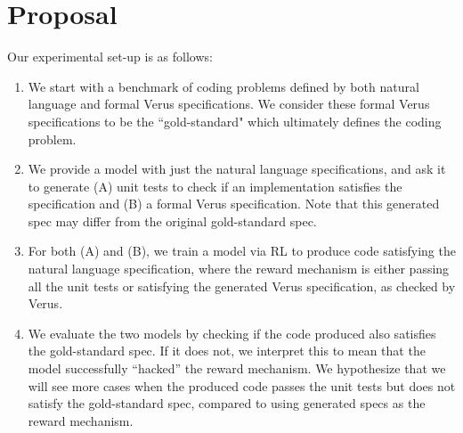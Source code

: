 \documentclass[11pt]{article}
\begin{document}
\section{Proposal}
 Our experimental set-up is as follows:
\begin{enumerate}
    \item We start with a benchmark of coding problems 
    defined by both natural language and formal Verus specifications. 
    We consider these formal Verus specifications to be the ``gold-standard" 
    which ultimately defines the coding problem.
    \item We provide a model with just the natural language specifications, 
    and ask it to generate 
    (A) unit tests to check if an implementation satisfies the specification and 
    (B) a formal Verus specification. 
    Note that this generated spec may differ from the original gold-standard spec.
    \item For both (A) and (B), we train a model via RL to produce code satisfying
    the natural language specification, 
    where the reward mechanism is either passing all the unit tests 
    or satisfying the generated Verus specification, as checked by Verus.
    \item We evaluate the two models by checking if the code produced also satisfies
    the gold-standard spec. 
    If it does not, we interpret this to mean that the model successfully ``hacked''
    the reward mechanism. 
    We hypothesize that we will see more cases 
    when the produced code passes the unit tests but does not satisfy the gold-standard spec,
    compared to using generated specs as the reward mechanism.
\end{enumerate}
\end{document}
